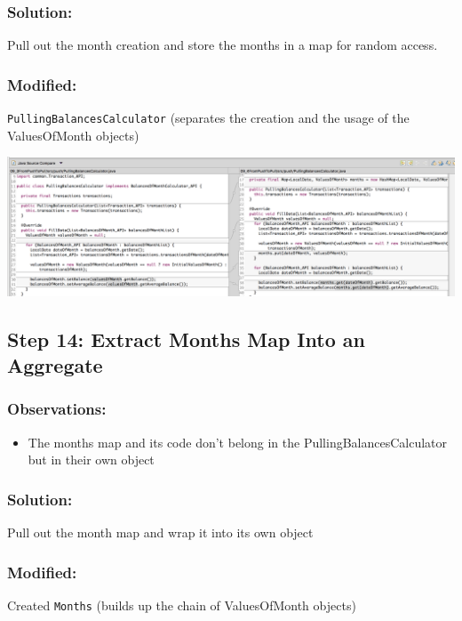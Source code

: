 \documentclass[a4paper,fleqn,titlepage,11pt]{article}
\begin{document}
\subsubsection*{Solution:}

Pull out the month creation and store the months in a map for random access.

\subsubsection*{Modified:}

\texttt{PullingBalancesCalculator} (separates the creation and the usage of the ValuesOfMonth objects)

\includegraphics[width=1\textwidth]{CompareViews/12-13.png}

\subsection*{Step 14: Extract Months Map Into an Aggregate}

\subsubsection*{Observations:}
\begin{itemize}
\item The months map and its code don't belong in the PullingBalancesCalculator but in their own object
\end{itemize}

\subsubsection*{Solution:}

Pull out the month map and wrap it into its own object

\subsubsection*{Modified:}

Created \texttt{Months} (builds up the chain of ValuesOfMonth objects)
\end{document}
